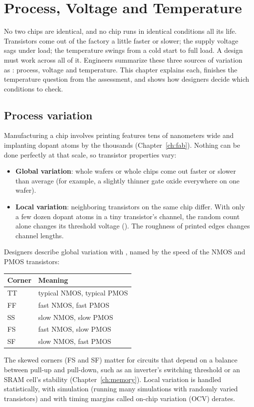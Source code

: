 \chapter{Process, Voltage and Temperature}
\label{ch:pvt}

No two chips are identical, and no chip runs in identical conditions all its life. Transistors come out of the factory a little faster or slower; the supply voltage sags under load; the temperature swings from a cold start to full load. A design must work across all of it. Engineers summarize these three sources of variation as : process, voltage and temperature. This chapter explains each, finishes the temperature question from the assessment, and shows how designers decide which conditions to check.

\section{Process variation}

Manufacturing a chip involves printing features tens of nanometers wide and implanting dopant atoms by the thousands (Chapter~\ref{ch:fab}). Nothing can be done perfectly at that scale, so transistor properties vary:
\begin{itemize}
  \item \textbf{Global variation}: whole wafers or whole chips come out faster or slower than average (for example, a slightly thinner gate oxide everywhere on one wafer).
  \item \textbf{Local variation}: neighboring transistors on the same chip differ. With only a few dozen dopant atoms in a tiny transistor's channel, the random count alone changes its threshold voltage (). The roughness of printed edges changes channel lengths.
\end{itemize}

Designers describe global variation with , named by the speed of the NMOS and PMOS transistors:
\begin{center}
\begin{tabular}{ll}
\toprule
Corner & Meaning \\
\midrule
TT & typical NMOS, typical PMOS \\
FF & fast NMOS, fast PMOS \\
SS & slow NMOS, slow PMOS \\
FS & fast NMOS, slow PMOS \\
SF & slow NMOS, fast PMOS \\
\bottomrule
\end{tabular}
\end{center}
The skewed corners (FS and SF) matter for circuits that depend on a balance between pull-up and pull-down, such as an inverter's switching threshold or an SRAM cell's stability (Chapter~\ref{ch:memory}). Local variation is handled statistically, with  simulation (running many simulations with randomly varied transistors) and with timing margins called on-chip variation (OCV) derates.

